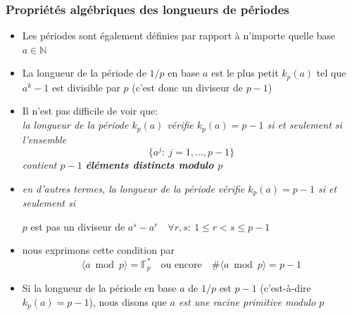 \documentclass[10pt,handout]{beamer} %
\newcommand{\N}{\mathbb N}
\newcommand{\F}{\mathbb F}
\theoremstyle{definition}
\begin{document}
\begin{frame}
 \frametitle{Propri\'et\'es alg\'ebriques des longueurs de p\'eriodes}
\begin{itemize}[<+-|alert@+>]
\item Les p\'eriodes sont \'egalement d\'efinies par rapport \`a n'importe quelle base $a\in\N$
\item La longueur de la p\'eriode de $1/p$ en base $a$ est le plus petit $k_p(a)$ tel que $a^k-1$ est divisible par $p$ (c'est donc un diviseur de $p-1$)
\item Il n'est pas difficile de voir que:\\
\emph{ la longueur de la p\'eriode $k_p(a)$ v\'erifie $k_p(a)=p-1$ si et seulement si l'ensemble
$$\{a^j:\ j=1,\ldots,p-1\}$$
contient $p-1$ \textbf{\'el\'ements distincts modulo $p$}}
\item \emph{en d'autres termes, la longueur de la p\'eriode v\'erifie  $k_p(a)=p-1$ si et seulement si}\medskip

\centerline{$p$ est pas un diviseur de $a^s-a^r\quad\forall r,s:\ 1\le r<s\le p-1$}
\item nous exprimons cette condition par 
$$\langle a\bmod p\rangle=\F_p^*\quad\text{ou encore}\quad\#\langle a\bmod p\rangle=p-1$$
\item Si la longueur de la p\'eriode en base $a$ de $1/p$ est $p-1$ (c'est-\`a-dire $k_p(a)=p-1$), nous disons que \emph{$a$ est une racine primitive modulo $p$}

\end{itemize}
\end{frame}
\end{document}
